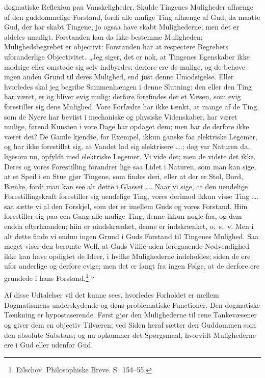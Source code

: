 \documentclass[12pt]{book}
\newcommand{\opage}[1]{\marginnote{\footnotesize\textit{[#1]}}}
\begin{document}
\opage{228}dogmatiske Reflexion paa Vanskeligheder. Skulde Tingenes Muligheder afhænge af den guddommelige Forstand, fordi alle mulige Ting afhænge af Gud, da maatte Gud, der har skabt Tingene, jo ogsaa have skabt Mulighederne; men det er aldeles umuligt. Forstanden kan da ikke bestemme Muligheden; Mulighedsbegrebet er objectivt: Forstanden har at respectere Begrebets uforanderlige Objectivitet. „Jeg siger, det er nok, at Tingenes Egenskaber ikke modsige eller omstøde sig selv indbyrdes; derfore ere de mulige, og de behøve ingen anden Grund til deres Mulighed, end just denne Umodsigelse. Eller hvorledes skal jeg begribe Sammenhængen i denne Slutning: den eller den Ting har været, er og bliver evig mulig; derfore forefindes der et Væsen, som evig forestiller sig dens Mulighed. Vore Forfædre har ikke tænkt, at mange af de Ting, som de Nyere har beviist i mechaniske og physiske Videnskaber, har været mulige, førend Kunsten i vore Dage har opdaget dem; men har de derfore ikke været det? De Gamle kjendte, for Exempel, ikkun ganske faa elektriske Legemer, og har ikke forestillet sig, at Vandet lod sig elektrisere \dots.; dog var Naturen da, ligesom nu, opfyldt med elektriske Legemer. Vi vide det; men de vidste det ikke. Deres og vores Forestilling forandrer lige saa Lidet i Naturen, som man kan sige, at et Speil i en Stue gjør Tingene, som findes deri, eller at der er Stol, Bord, Bænke, fordi man kan see alt dette i Glasset \dots. Naar vi sige, at den uendelige Forestillingskraft forestiller sig uendelige Ting, vores derimod ikkun visse Ting \dots. saa sætte vi al den Forskjel, som der er imellem Guds og vores Forstand. Hiin forestiller sig paa een Gang alle mulige Ting, denne ikkun nogle faa, og dem endda efterhaanden; hiin er uindskrænket, denne er indskrænket, o.\ s.\ v. Men i alt dette finde vi endnu ingen Grund i Guds Forstand til Tingenes Mulighed. Saa meget viser den berømte Wolf, at Guds Villie uden foregaaende Nødvendighed ikke kan have opdigtet de Ideer, i hvilke Mulighederne indeholdes; siden de ere ufor%
\opage{229}anderlige og derfore evige; men det er langt fra ingen Følge, at de derfore ere grundede i hans Forstand.\footnote{Eilschov. Philosophiske Breve. S.~154--55.}%
“

Af disse Udtalelser vil det kunne sees, hvorledes Forholdet er mellem Dogmatismens underskydende og dens problematiske Functioner. Den dogmatiske Tænkning er hypostaserende. Først gjør den Mulighederne til rene Tankevæsener og giver dem en objectiv Tilværen; ved Siden heraf sætter den Guddommen som den absolute Substans; og nu opkommer det Spørgsmaal, hvorvidt Mulighederne ere i Gud eller udenfor Gud.
\end{document}
